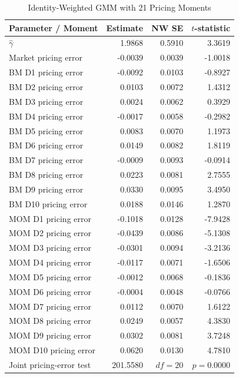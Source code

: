\documentclass[11pt]{article}
\begin{document}
\begin{table}[htbp]
  \centering
  \caption{Identity-Weighted GMM with 21 Pricing Moments}
  \label{tab:3e-gmm}
  \begin{minipage}{0.98\textwidth}
    \centering
    \scriptsize
    \begin{tabular*}{\linewidth}{@{\extracolsep{\fill}}lrrr@{}}
      \toprule
      Parameter / Moment & Estimate & NW SE & $t$-statistic \\
      \midrule
      $\hat{\gamma}$ & 1.9868 & 0.5910 & 3.3619 \\
      Market pricing error & -0.0039 & 0.0039 & -1.0018 \\
      BM D1 pricing error & -0.0092 & 0.0103 & -0.8927 \\
      BM D2 pricing error & 0.0103 & 0.0072 & 1.4312 \\
      BM D3 pricing error & 0.0024 & 0.0062 & 0.3929 \\
      BM D4 pricing error & -0.0017 & 0.0058 & -0.2982 \\
      BM D5 pricing error & 0.0083 & 0.0070 & 1.1973 \\
      BM D6 pricing error & 0.0149 & 0.0082 & 1.8119 \\
      BM D7 pricing error & -0.0009 & 0.0093 & -0.0914 \\
      BM D8 pricing error & 0.0223 & 0.0081 & 2.7555 \\
      BM D9 pricing error & 0.0330 & 0.0095 & 3.4950 \\
      BM D10 pricing error & 0.0188 & 0.0146 & 1.2870 \\
      MOM D1 pricing error & -0.1018 & 0.0128 & -7.9428 \\
      MOM D2 pricing error & -0.0439 & 0.0086 & -5.1308 \\
      MOM D3 pricing error & -0.0301 & 0.0094 & -3.2136 \\
      MOM D4 pricing error & -0.0117 & 0.0071 & -1.6506 \\
      MOM D5 pricing error & -0.0012 & 0.0068 & -0.1836 \\
      MOM D6 pricing error & -0.0004 & 0.0048 & -0.0766 \\
      MOM D7 pricing error & 0.0112 & 0.0070 & 1.6122 \\
      MOM D8 pricing error & 0.0249 & 0.0057 & 4.3830 \\
      MOM D9 pricing error & 0.0302 & 0.0081 & 3.7248 \\
      MOM D10 pricing error & 0.0620 & 0.0130 & 4.7810 \\
      \midrule
      Joint pricing-error test & 201.5580 & $df=20$ & $p=0.0000$ \\
      \bottomrule
    \end{tabular*}


\end{minipage}
\end{table}
\end{document}
